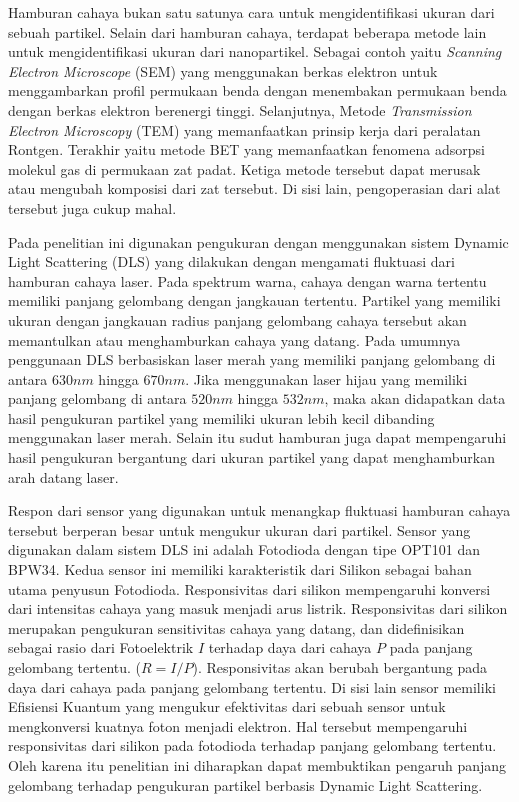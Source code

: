 Hamburan cahaya bukan satu satunya cara untuk mengidentifikasi ukuran dari sebuah partikel. Selain
dari hamburan cahaya, terdapat beberapa metode lain untuk mengidentifikasi ukuran dari nanopartikel.
Sebagai contoh yaitu \textit{Scanning Electron Microscope} (SEM) yang menggunakan berkas elektron
untuk menggambarkan profil permukaan benda dengan menembakan permukaan benda dengan berkas elektron
berenergi tinggi. Selanjutnya, Metode \textit{Transmission Electron Microscopy} (TEM) yang
memanfaatkan prinsip kerja dari peralatan Rontgen. Terakhir yaitu metode BET yang memanfaatkan
fenomena adsorpsi molekul gas di permukaan zat padat. Ketiga metode tersebut dapat merusak atau
mengubah komposisi dari zat tersebut. Di sisi lain, pengoperasian dari alat tersebut juga cukup
mahal.

Pada penelitian ini digunakan pengukuran dengan menggunakan sistem Dynamic Light Scattering (DLS)
yang dilakukan dengan mengamati fluktuasi dari hamburan cahaya laser. Pada spektrum warna, cahaya
dengan warna tertentu memiliki panjang gelombang dengan jangkauan tertentu. Partikel yang memiliki
ukuran dengan jangkauan radius panjang gelombang cahaya tersebut akan memantulkan atau menghamburkan
cahaya yang datang. Pada umumnya penggunaan DLS berbasiskan laser merah yang memiliki panjang
gelombang di antara ${630 nm}$ hingga ${670 nm}$. Jika menggunakan laser hijau yang memiliki panjang
gelombang di antara ${520 nm}$ hingga ${532 nm}$, maka akan didapatkan data hasil pengukuran
partikel yang memiliki ukuran lebih kecil dibanding menggunakan laser merah\cite{Black1996}. Selain
itu sudut hamburan juga dapat mempengaruhi hasil pengukuran bergantung dari ukuran partikel yang
dapat menghamburkan arah datang laser\cite{DeVos2021}.

Respon dari sensor yang digunakan untuk menangkap fluktuasi hamburan cahaya tersebut berperan besar
untuk mengukur ukuran dari partikel. Sensor yang digunakan dalam sistem DLS ini adalah Fotodioda
dengan tipe OPT101 dan BPW34. Kedua sensor ini memiliki karakteristik dari Silikon sebagai bahan
utama penyusun Fotodioda. Responsivitas dari silikon mempengaruhi konversi dari intensitas cahaya
yang masuk menjadi arus listrik. Responsivitas dari silikon merupakan pengukuran sensitivitas cahaya
yang datang, dan didefinisikan sebagai rasio dari Fotoelektrik ${I}$ terhadap daya dari cahaya
${P}$ pada panjang gelombang tertentu. (${R = I/P}$). Responsivitas akan berubah bergantung pada
daya dari cahaya pada panjang gelombang tertentu. Di sisi lain sensor memiliki Efisiensi Kuantum
yang mengukur efektivitas dari sebuah sensor untuk mengkonversi kuatnya foton menjadi elektron.
Hal tersebut mempengaruhi responsivitas dari silikon pada fotodioda terhadap panjang gelombang
tertentu. Oleh karena itu penelitian ini diharapkan dapat membuktikan pengaruh panjang gelombang
terhadap pengukuran partikel berbasis Dynamic Light Scattering.


